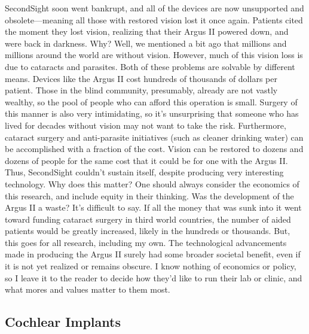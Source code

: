 SecondSight soon went bankrupt, and all of the devices are now unsupported and obsolete---meaning all those with restored vision lost it once again. Patients cited the moment they lost vision, realizing that their Argus II powered down, and were back in darkness. Why? Well, we mentioned a bit ago that millions and millions around the world are without vision. However, much of this vision loss is due to cataracts and parasites. Both of these problems are solvable by different means. Devices like the Argus II cost hundreds of thousands of dollars per patient. Those in the blind community, presumably, already are not vastly wealthy, so the pool of people who can afford this operation is small. Surgery of this manner is also very intimidating, so it's unsurprising that someone who has lived for decades without vision may not want to take the risk. Furthermore, cataract surgery and anti-parasite initiatives (such as cleaner drinking water) can be accomplished with a fraction of the cost. Vision can be restored to dozens and dozens of people for the same cost that it could be for one with the Argus II. Thus, SecondSight couldn't sustain itself, despite producing very interesting technology. Why does this matter? One should always consider the economics of this research, and include equity in their thinking. Was the development of the Argus II a waste? It's difficult to say. If all the money that was sunk into it went toward funding cataract surgery in third world countries, the number of aided patients would be greatly increased, likely in the hundreds or thousands. But, this goes for all research, including my own. The technological advancements made in producing the Argus II surely had some broader societal benefit, even if it is not yet realized or remains obscure. I know nothing of economics or policy, so I leave it to the reader to decide how they'd like to run their lab or clinic, and what mores and values matter to them most. 

\subsection{Cochlear Implants}

